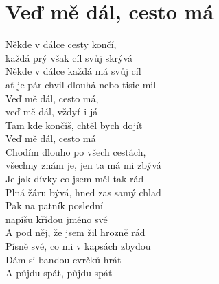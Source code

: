 \section{Veď mě dál, cesto má}
\onehalfspacing

Někde v dálce cesty končí, \\
každá prý však cíl svůj skrývá\\
Někde v dálce každá má svůj cíl \\
ať je pár chvil dlouhá nebo tisic mil\\

Veď mě dál, cesto má, \\
veď mě dál, vždyť i já\\
Tam kde končíš, chtěl bych dojít\\
Veď mě dál, cesto má\\

\sloka
Chodím dlouho po všech cestách, \\
všechny znám je, jen ta má mi zbývá\\
Je jak dívky co jsem měl tak rád\\
Plná žáru bývá, hned zas samý chlad\\

{}Pak na patník poslední \\
napíšu křídou jméno své\\
A pod něj, že jsem žil hrozně rád\\
Písně své, co mi v kapsách zbydou\\
Dám si bandou cvrčků hrát\\
A půjdu spát, půjdu spát\\